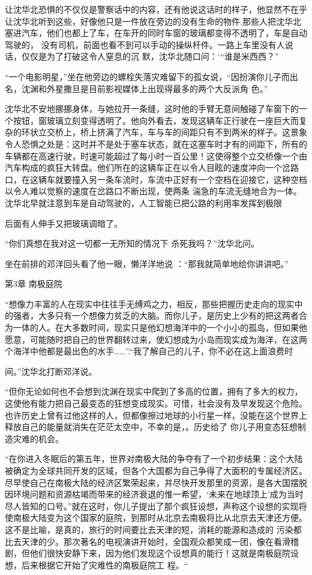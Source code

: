 \documentclass{article}
\begin{document}
让沈华北恐惧的不仅仅是警察话中的内容，还有他说这话时的样子，他显然不在乎让沈华北听到这些，好像他只是一件放在旁边的没有生命的物件.那些人把沈华北塞进汽车，他们也都上了车，在车开的同时车窗的玻璃都变得不透明了，车是自动驾驶的，
\newpage
没有司机，前面也看不到可以手动的操纵杆件。一路上车里没有人说话，仅仅是为了打破这令人窒息的沉
默，沈华北随口问：‘“谁是米西西？” 

“一个电影明星，”坐在他旁边的螺栓失落灾难留下的孤女说，“因扮演你儿子而出名，沈渊和外星撒旦是目前影视媒体上出现得最多的两个大反派角
色。” 

沈华北不安地挪挪身体，与她拉开一条缝，这时他的手臂无意间触碰了车窗下的一个按钮，窗玻璃立刻变得透明了。他向外看去，发现这辆车正行驶在一座巨大而复杂的环状立交桥上，桥上挤满了汽车，车与车的间距只有不到两米的样子。这景象令人恐惧之处是：这时并不是处于塞车状态，就在这塞车时才有的间距下，所有的车辆都在高速行驶，时速可能超过了每小时一百公里！这使得整个立交桥像一个由汽车构成的疯狂大转盘。他们所在的这辆车正在以令人目眩的速度冲向一个岔路口，在这辆车就要撞入另一条车流时，车流中正好有一个空档在迎接它，这种空档以令人难以觉察的速度在岔路口不断出现，使两条
\newpage
湍急的车流无缝地合为一体。沈华北早就注意到车是自动驾驶的，人工智能已把公路的利用率发挥到极限


后面有人伸手又把玻璃调暗了。 

“你们真想在我对这一切都一无所知的情况下
杀死我吗？”沈华北问。 

坐在前排的邓洋回头看了他一眼，懒洋洋地说
：“那我就简单地给你讲讲吧。” 


第3章 南极庭院 

“想像力丰富的人在现实中往往手无缚鸡之力，相反，那些把握历史走向的现实中的强者，大多只有一个想像力贫乏的大脑。而你儿子，是历史上少有的把这两者合为一体的人。在大多数时间，现实只是他幻想海洋中的一个小小的孤岛，但如果他愿意，可能随时把自己的世界翻转过来，使幻想成为小岛而现实成为海洋，在这两个海洋中他都是最出色的水手……”.“我了解自己的儿子，你不必在这上面浪费时
\newpage

间。”沈华北打断邓洋说。 

“但你无论如何也不会想到沈渊在现实中爬到了多高的位置，拥有了多大的权力，这使他有能力把自己最变态的狂想变成现实。可惜，社会没有及早发现这个危险。也许历史上曾有过他这样的人，但都像擦过地球的小行星一样，没能在这个世界上释放自己的能量就消失在茫茫太空中，不幸的是，。历史给了
你儿子用变态狂想制造灾难的机会。 

“在你进入冬眠后的第五年，世界对南极大陆的争夺有了一个初步结果：这个大陆被确定为全球共同开发的区域，但各个大国都为自己争得了大面积的专属经济区。尽早使自己在南极大陆的经济区繁荣起来，并尽快开发那里的资源，是各大国摆脱因环境问题和资源枯竭而带来的经济衰退的惟一希望，‘未来在地球顶上’成为当时尽人皆知的口号。”就在这时，你儿子提出了那个疯狂设想，声称这个设想的实现将使南极大陆变为这个国家的庭院，到那时从北京去南极将比从北京去天津还方便。这不是比喻，是真的，旅行的时间要比去天津的短，消耗的能源和造成的
\newpage
污染都比去天津的少。那次著名的电视演讲开始时，全国观众都笑成一团，像在看滑稽剧，但他们很快安静下来，因为他们发现这个设想真的能行！这就是南极庭院设想，后来根据它开始了灾难性的南极庭院工
程。“ 
\end{document}
